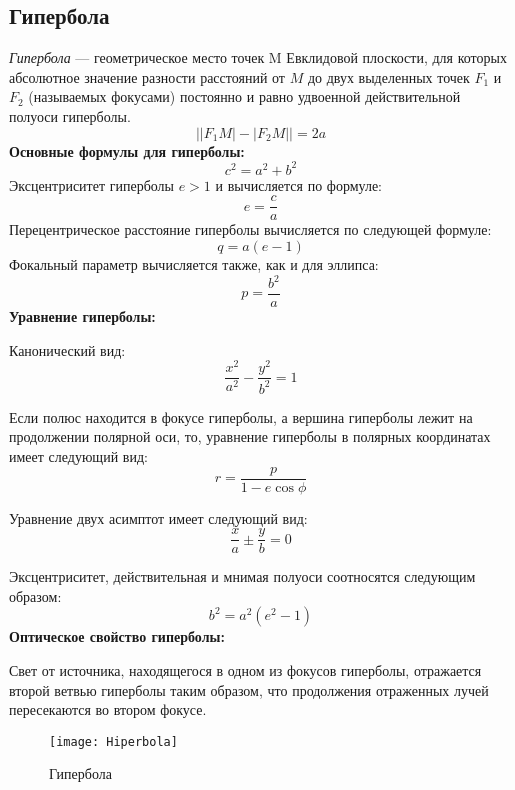 \subsection{Гипербола}
 
\textsl{Гипербола} --- геометрическое место точек M Евклидовой плоскости, для которых абсолютное значение разности расстояний от $M$ до двух выделенных точек $F_1$ и $F_2$ (называемых фокусами) постоянно и равно удвоенной действительной полуоси гиперболы.
\begin{equation}
\bigl||F_1M|-|F_2M|\bigr|=2a
\end{equation}
\textbf{Основные формулы для гиперболы:}
\begin{equation}
c^2=a^2+b^2
\end{equation}
Эксцентриситет гиперболы $e>1$ и вычисляется по формуле:
\begin{equation}
e=\frac{c}{a}
\end{equation}
Перецентрическое расстояние гиперболы вычисляется по следующей формуле:
\begin{equation}
q=a(e-1)
\end{equation}
Фокальный параметр вычисляется также, как и для эллипса:
\begin{equation}
p=\frac{b^2}{a}
\end{equation}
\textbf{Уравнение гиперболы:}

Канонический вид:
\begin{equation}
\frac{x^2}{a^2}-\frac{y^2}{b^2}=1
\end{equation}

Если полюс находится в фокусе гиперболы, а вершина гиперболы лежит на продолжении полярной оси, то, уравнение гиперболы в полярных координатах имеет следующий вид:
\begin{equation}
r=\frac{p}{1-e\cos\phi}
\end{equation}

Уравнение двух асимптот имеет следующий вид:
\begin{equation}
\frac{x}{a}\pm\frac{y}{b}=0
\end{equation}

Эксцентриситет, действительная и мнимая полуоси соотносятся следующим образом:
\begin{equation}
b^2=a^2(e^2-1)
\end{equation}
\textbf{Оптическое свойство гиперболы:}

Свет от источника, находящегося в одном из фокусов гиперболы, отражается второй ветвью гиперболы таким образом, что продолжения отраженных лучей пересекаются во втором фокусе.
\begin{figure}[h!]
\centering
\texttt{[image: Hiperbola]}
\caption{Гипербола \label{pic:the-pic}}
\end{figure}